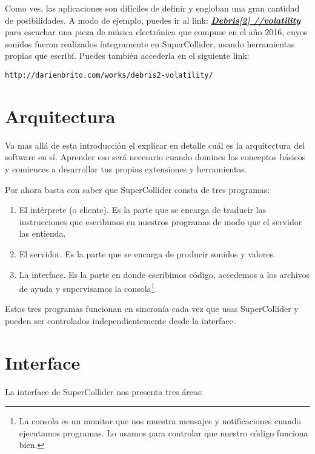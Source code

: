 Como ves, las aplicaciones son difíciles de definir y engloban una gran cantidad de posibilidades. A modo de ejemplo, puedes ir al link: \href{https://soundcloud.com/darien-brito/debris2-volatility-stereo-version}{\textbf{\textit{Debris[2] //volatility}}} para escuchar una pieza de música electrónica que compuse en el año 2016, cuyos sonidos fueron realizados íntegramente en SuperCollider, usando herramientas propias que escribí. Puedes también accederla en el siguiente link:

\begin{verbatim}
http://darienbrito.com/works/debris2-volatility/
\end{verbatim}

\section{Arquitectura}

Va mas allá de esta introducción el explicar en detalle cuál es la arquitectura del software en sí. Aprender eso será necesario cuando domines los conceptos básicos y comiences a desarrollar tus propias extensiones y herramientas. 

Por ahora basta con saber que SuperCollider consta de tres programas: 

\begin{enumerate}
	\item El intérprete (o cliente). Es la parte que se encarga de traducir las instrucciones que escribimos en nuestros programas de modo que el servidor las entienda.
	\item El servidor. Es la parte que se encarga de producir sonidos y valores.
	\item La interface. Es la parte en donde escribimos código, accedemos a los archivos de ayuda y supervisamos la consola\footnote{La consola es un monitor que nos muestra mensajes y notificaciones cuando ejecutamos programas. Lo usamos para controlar que nuestro código funciona bien.}. 
\end{enumerate}

Estos tres programas funcionan en sincronía cada vez que usas SuperCollider y pueden ser controlados independientemente desde la interface.

\section{Interface}

La interface de SuperCollider nos presenta tres áreas:

